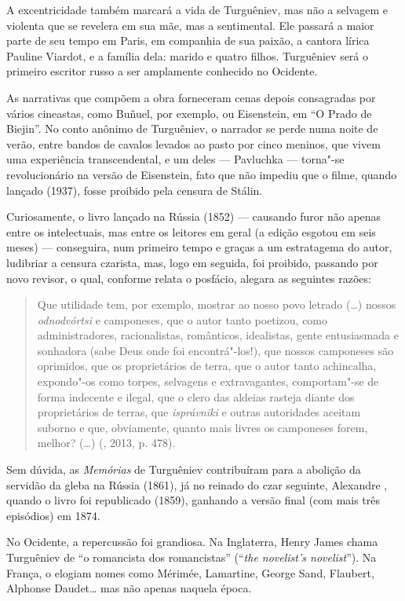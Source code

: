 A excentricidade também marcará a vida de Turguêniev, mas não a selvagem
e violenta que se revelera em sua mãe, mas a sentimental. Ele passará a
maior parte de seu tempo em Paris, em companhia de sua paixão, a cantora
lírica Pauline Viardot, e a família dela: marido e quatro filhos.
Turguêniev será o primeiro escritor russo a ser amplamente conhecido no
Ocidente.

As narrativas que compõem a obra forneceram cenas depois consagradas por
vários cineastas, como Buñuel, por exemplo, ou Eisenstein, em ``O
Prado de Biejin''. No conto anônimo de Turguêniev, o narrador se perde
numa noite de verão, entre bandos de cavalos levados ao pasto por cinco
meninos, que vivem uma experiência transcendental, e um deles ---
Pavluchka --- torna"-se revolucionário na versão de Eisenstein, fato que
não impediu que o filme, quando lançado (1937), fosse proibido pela
censura de Stálin.

Curiosamente, o livro lançado na Rússia (1852) --- causando furor não
apenas entre os intelectuais, mas entre os leitores em geral (a edição
esgotou em seis meses) --- conseguira, num primeiro tempo e graças a um
estratagema do autor, ludibriar a censura czarista, mas, logo em
seguida, foi proibido, passando por novo revisor, o qual, conforme
relata o posfácio, alegara as seguintes razões:

\begin{quote}
Que utilidade tem, por exemplo, mostrar ao nosso povo letrado (\ldots{})
nossos \emph{odnodvórtsi} e camponeses, que o autor tanto poetizou, como
administradores, racionalistas, românticos, idealistas, gente
entusiasmada e sonhadora (sabe Deus onde foi encontrá"-los!), que nossos
camponeses são oprimidos, que os proprietários de terra, que o autor
tanto achincalha, expondo"-os como torpes, selvagens e extravagantes,
comportam"-se de forma indecente e ilegal, que o clero das aldeias
rasteja diante dos proprietários de terras, que \emph{isprávniki} e
outras autoridades aceitam suborno e que, obviamente, quanto mais livres
os camponeses forem, melhor? (\ldots{}) (, 2013, p. 478).
\end{quote}

Sem dúvida, as \emph{Memórias} de Turguêniev contribuíram para a
abolição da servidão da gleba na Rússia (1861), já no reinado do czar
seguinte, Alexandre , quando o livro foi republicado (1859), ganhando
a versão final (com mais três episódios) em 1874.

No Ocidente, a repercussão foi grandiosa. Na Inglaterra, Henry James
chama Turguêniev de ``o romancista dos romancistas'' (``\emph{the
novelist's novelist}''). Na França, o elogiam nomes como Mérimée,
Lamartine, George Sand, Flaubert, Alphonse Daudet\ldots{} mas não apenas
naquela época.

